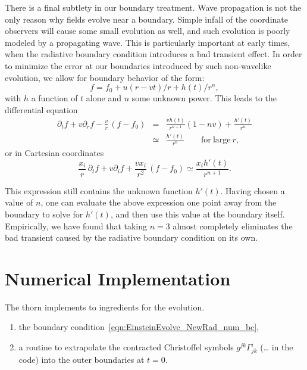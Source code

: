 There is a final subtlety in our boundary treatment.  Wave propagation
is not the only reason why fields evolve near a boundary.  Simple
infall of the coordinate observers will cause some small evolution as
well, and such evolution is poorly modeled by a propagating wave. This
is particularly important at early times, when the radiative boundary
condition introduces a bad transient effect. In order to minimize the
error at our boundaries introduced by such non-wavelike evolution, we
allow for boundary behavior of the form:
\begin{equation}
f = f_0 + u(r-vt)/r + h(t)/r^n ,
\label{eq:radpower}
\end{equation}
with $h$ a function of $t$ alone and $n$ some unknown power. This
leads to the differential equation
\begin{eqnarray}
\partial_t f + v \partial_r f
- \frac{v}{r} \, (f - f_0) &=&
\frac{v h(t)}{r^{n+1}} \left( 1 - n v \right)
+ \frac{h'(t)}{r^n} \nonumber \\
&\simeq& \frac{h'(t)}{r^n} \qquad \mathrm{for\ large\ } r ,
\end{eqnarray}
or in Cartesian coordinates
\begin{equation}
\frac{x_i}{r} \, \partial_t f + v \partial_i f + \frac{v x_i}{r^2} \,
\left( f - f_0 \right) \simeq \frac{x_i h'(t)}{r^{n+1}} .
\label{eqn:EinsteinEvolve_NewRad_num_bc}
\end{equation}

This expression still contains the unknown function $h'(t)$. Having
chosen a value of $n$, one can evaluate the above expression one point
away from the boundary to solve for $h'(t)$, and then use this value
at the boundary itself.  Empirically, we have found that taking $n=3$
almost completely eliminates the bad transient caused by the radiative
boundary condition on its own.

\section{Numerical Implementation}
The thorn implements to ingredients for the evolution.
\begin{enumerate}
\item the boundary condition~\eqref{eqn:EinsteinEvolve_NewRad_num_bc},
\item a routine to extrapolate the contracted Christoffel symbols
$g^{jk} \Gamma^i_{jk}$ (\ldots{} in the code) into the
outer boundaries at $t=0$.
\end{enumerate}

